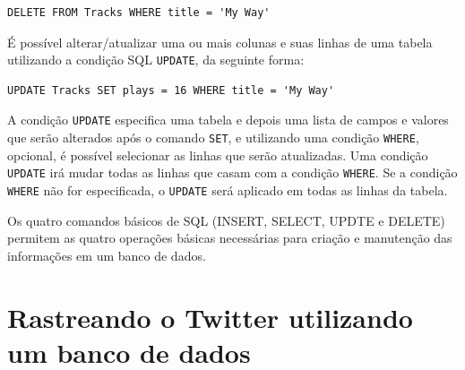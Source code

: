 \beforeverb
\begin{verbatim}
DELETE FROM Tracks WHERE title = 'My Way'
\end{verbatim}
\afterverb
%
%
É possível alterar/atualizar uma ou mais colunas e suas linhas de uma tabela
utilizando a condição SQL {\tt UPDATE}, da seguinte forma:

\beforeverb
\begin{verbatim}
UPDATE Tracks SET plays = 16 WHERE title = 'My Way'
\end{verbatim}
\afterverb
%
%
A condição {\tt UPDATE} especifica uma tabela e depois uma lista de campos e
valores que serão alterados após o comando {\tt SET}, e utilizando uma condição
{\tt WHERE}, opcional, é possível selecionar as linhas que serão atualizadas.
Uma condição {\tt UPDATE} irá mudar todas as linhas que casam com a condição
{\tt WHERE}. Se a condição {\tt WHERE} não for especificada, o {\tt UPDATE}
será aplicado em todas as linhas da tabela.


Os quatro comandos básicos de SQL (INSERT, SELECT, UPDTE e DELETE) permitem
as quatro operações básicas necessárias para criação e manutenção das
informações em um banco de dados.

\section{Rastreando o Twitter utilizando um banco de dados}


